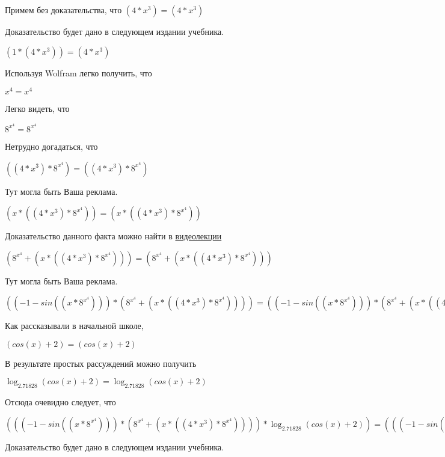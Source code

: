 \documentclass[12pt,a4paper,fleqn]{article}
\theoremstyle{definition}
\begin{document}
Примем без доказательства, что
$( 4  * { x }^{ 3 }) = ( 4  * { x }^{ 3 })$

Доказательство будет дано в следующем издании учебника.

$( 1  * ( 4  * { x }^{ 3 })) = ( 4  * { x }^{ 3 })$

Используя Wolfram легко получить, что

${ x }^{ 4 } = { x }^{ 4 }$

Легко видеть, что

${ 8 }^{{ x }^{ 4 }} = { 8 }^{{ x }^{ 4 }}$

Нетрудно догадаться, что

$(( 4  * { x }^{ 3 }) * { 8 }^{{ x }^{ 4 }}) = (( 4  * { x }^{ 3 }) * { 8 }^{{ x }^{ 4 }})$

Тут могла быть Ваша реклама.

$( x  * (( 4  * { x }^{ 3 }) * { 8 }^{{ x }^{ 4 }})) = ( x  * (( 4  * { x }^{ 3 }) * { 8 }^{{ x }^{ 4 }}))$

Доказательство данного факта можно найти в \href{https://www.youtube.com/watch?v=dQw4w9WgXcQ}{видеолекции}

$({ 8 }^{{ x }^{ 4 }} + ( x  * (( 4  * { x }^{ 3 }) * { 8 }^{{ x }^{ 4 }}))) = ({ 8 }^{{ x }^{ 4 }} + ( x  * (( 4  * { x }^{ 3 }) * { 8 }^{{ x }^{ 4 }})))$

Тут могла быть Ваша реклама.

$(( -1  - sin(( x  * { 8 }^{{ x }^{ 4 }}))) * ({ 8 }^{{ x }^{ 4 }} + ( x  * (( 4  * { x }^{ 3 }) * { 8 }^{{ x }^{ 4 }})))) = (( -1  - sin(( x  * { 8 }^{{ x }^{ 4 }}))) * ({ 8 }^{{ x }^{ 4 }} + ( x  * (( 4  * { x }^{ 3 }) * { 8 }^{{ x }^{ 4 }}))))$

Как рассказывали в начальной школе,

$(cos( x ) +  2 ) = (cos( x ) +  2 )$

В результате простых рассуждений можно получить

$\log_{ 2.71828 }{(cos( x ) +  2 )} = \log_{ 2.71828 }{(cos( x ) +  2 )}$

Отсюда очевидно следует, что

$((( -1  - sin(( x  * { 8 }^{{ x }^{ 4 }}))) * ({ 8 }^{{ x }^{ 4 }} + ( x  * (( 4  * { x }^{ 3 }) * { 8 }^{{ x }^{ 4 }})))) * \log_{ 2.71828 }{(cos( x ) +  2 )}) = ((( -1  - sin(( x  * { 8 }^{{ x }^{ 4 }}))) * ({ 8 }^{{ x }^{ 4 }} + ( x  * (( 4  * { x }^{ 3 }) * { 8 }^{{ x }^{ 4 }})))) * \log_{ 2.71828 }{(cos( x ) +  2 )})$

Доказательство будет дано в следующем издании учебника.
\end{document}
